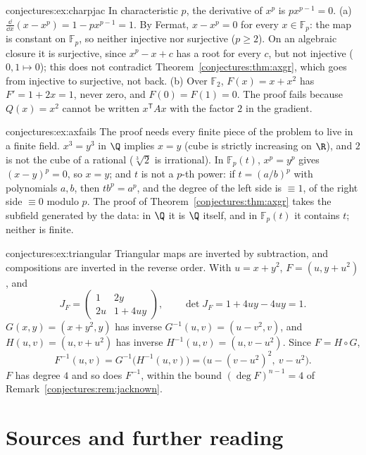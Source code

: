 \begin{solution}{conjectures:ex:charpjac}
\idea In characteristic $p$, the derivative of $x^p$ is $px^{p-1}=0$.
\writeup (a) $\frac{\dd}{\dd x}(x-x^p)=1-px^{p-1}=1$. By Fermat, $x-x^p=0$ for every $x\in\mathbb F_p$: the map is constant on $\mathbb F_p$, so neither injective
nor surjective ($p\ge2$). On an algebraic closure it is surjective, since $x^p-x+c$ has a root for every $c$, but not injective ($0,1\mapsto0$); this does
not contradict Theorem~\ref{conjectures:thm:axgr}, which goes from injective to surjective, not back. (b) Over $\mathbb F_2$, $F(x)=x+x^2$ has $F'=1+2x=1$, never zero,
and $F(0)=F(1)=0$. The proof fails because $Q(x)=x^2$ cannot be written $x^{\mathsf T}Ax$ with the factor $2$ in the gradient.
\end{solution}

\begin{solution}{conjectures:ex:axfails}
\idea The proof needs every finite piece of the problem to live in a finite field.
\writeup $x^3=y^3$ in $\Q$ implies $x=y$ (cube is strictly increasing on $\R$), and $2$ is not the cube of a rational ($\sqrt[3]2$ is irrational). In
$\mathbb F_p(t)$, $x^p=y^p$ gives $(x-y)^p=0$, so $x=y$; and $t$ is not a $p$-th power: if $t=(a/b)^p$ with polynomials $a,b$, then $tb^p=a^p$, and the
degree of the left side is $\equiv1$, of the right side $\equiv0$ modulo $p$. The proof of Theorem~\ref{conjectures:thm:axgr} takes the subfield generated by the data:
in $\Q$ it is $\Q$ itself, and in $\mathbb F_p(t)$ it contains $t$; neither is finite.
\end{solution}

\begin{solution}{conjectures:ex:triangular}
\idea Triangular maps are inverted by subtraction, and compositions are inverted in the reverse order.
\writeup With $u=x+y^2$, $F=(u,y+u^2)$, and
\[
J_F=\begin{pmatrix}1&2y\\2u&1+4uy\end{pmatrix},\qquad\det J_F=1+4uy-4uy=1.
\]
$G(x,y)=(x+y^2,y)$ has inverse $G^{-1}(u,v)=(u-v^2,v)$, and $H(u,v)=(u,v+u^2)$ has inverse $H^{-1}(u,v)=(u,v-u^2)$. Since $F=H\circ G$,
\[
F^{-1}(u,v)=G^{-1}\bigl(H^{-1}(u,v)\bigr)=\bigl(u-(v-u^2)^2,\ v-u^2\bigr).
\]
$F$ has degree $4$ and so does $F^{-1}$, within the bound $(\deg F)^{n-1}=4$ of Remark~\ref{conjectures:rem:jacknown}.
\end{solution}

\section*{Sources and further reading}

